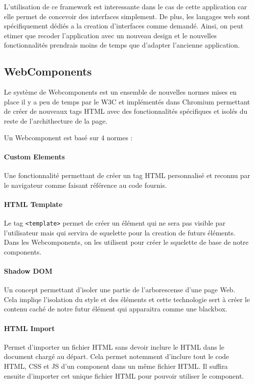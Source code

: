 L'utilisation de ce framework est interessante dans le cas de cette application car elle permet de concevoir des interfaces simplement.
De plus, les langages web sont spécifiquement dédiés a la creation d'interfaces comme demandé.
Ainsi, on peut etimer que recoder l'application avec un nouveau design et le nouvelles fonctionnalités prendrais moins de temps que d'adapter l'ancienne application.

\subsection{WebComponents}

Le système de Webcomponents est un ensemble de nouvelles normes mises en place il y a peu de temps par le W3C et implémentés dans Chromium permettant de créer de nouveaux tags HTML avec des fonctionnalités spécifiques et isolés du reste de l'archithecture de la page.

Un Webcomponent est basé sur 4 normes :

\paragraph{Custom Elements} Une fonctionnalité permettant de créer un tag HTML personnalisé et reconnu par le navigateur comme faisant référence au code fournis.

\paragraph{HTML Template} Le tag \texttt{<template>} permet de créer un élément qui ne sera pas visible par l'utilisateur mais qui servira de squelette pour la creation de futurs éléments.
Dans les Webcomponents, on les utilisent pour créer le squelette de base de notre components.

\paragraph{Shadow DOM} Un concept permettant d'isoler une partie de l'arborescense d'une page Web.
Cela impliqe l'isolation du style et des éléments et cette technologie sert à créer le contenu caché de notre futur élément qui apparaitra comme une blackbox.

\paragraph{HTML Import} Permet d'importer un fichier HTML sans devoir inclure le HTML dans le document chargé au départ.
Cela permet notemment d'inclure tout le code HTML, CSS et JS d'un component dans un même fichier HTML.
Il suffira ensuite d'importer cet unique fichier HTML pour pouvoir utiliser le component.

